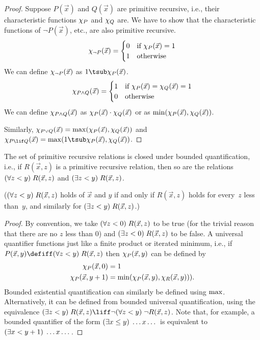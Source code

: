 \documentclass[../../../include/open-logic-section]{subfiles}
\begin{document}
\begin{proof}
  Suppose $P(\vec x)$ and $Q(\vec x)$ are primitive recursive, i.e.,
  their characteristic functions $\chi_{P}$ and $\chi_{Q}$ are.  We
  have to show that the characteristic functions of $\lnot P(\vec x)$,
  etc., are also primitive recursive.
  \[
  \Char{\lnot P}(\vec x) = \begin{cases}
    0 & \text{if $\Char{P}(\vec x) = 1$}\\
    1 & \text{otherwise}
  \end{cases}
  \]
  We can define $\chi_{\lnot P}(\vec x)$ as $1 \tsub \Char{P}(\vec x)$.
  \[
  \Char{P \land Q}(\vec x) = \begin{cases}
    1 & \text{if $\Char{P}(\vec x) = \Char{Q}(\vec x) = 1$}\\
    0 & \text{otherwise}
  \end{cases}
  \]
  We can define $\chi_{P \land Q}(\vec x)$ as $\chi_{P}(\vec x) \cdot
  \chi_{Q}(\vec x)$ or as $\mathrm{min}(\chi_{P}(\vec x), \chi_{Q}(\vec x))$.

  Similarly, $\chi_{P \lor Q}(\vec x) = \mathrm{max}(\chi_{P}(\vec x),
  \chi_{Q}(\vec x))$ and $\Char{P \lif Q}(\vec x) = \fn{max}(1 \tsub
  \Char{P}(\vec x), \Char{Q}(\vec x))$.
\end{proof}

\begin{prop}
  The set of primitive recursive relations is closed under bounded
  quantification, i.e., if $R(\vec x, z)$ is a primitive recursive
  relation, then so are the relations $(\forall z < y)\; R(\vec x, z)$
  and $(\exists z < y)\; R(\vec x, z)$.

  ($(\forall z < y)\; R(\vec x, z)$ holds of $\vec x$ and $y$ if and
  only if $R(\vec x, z)$ holds for every~$z$ less than~$y$, and
  similarly for $(\exists z < y)\; R(\vec x, z)$.)
\end{prop}

\begin{proof}
  By convention, we take $(\forall z < 0)\; R(\vec x, z)$ to be true
  (for the trivial reason that there are no $z$ less than $0$) and
  $(\exists z < 0)\; R(\vec x, z)$ to be false. A universal quantifier
  functions just like a finite product or iterated minimum, i.e., if
  $P(\vec x, y) \defiff \bforall{z < y}{R(\vec x, z)}$ then
  $\chi_{P}(\vec x, y)$ can be defined by
  \begin{align*}
    \Char{P}(\vec x, 0) & = 1\\
    \Char{P}(\vec x, y+1) & =
    \fn{min}(\Char{P}(\vec x, y), \Char{R}(\vec x, y))).
  \end{align*}
  Bounded existential quantification can similarly be defined using
  $\mathrm{max}$. Alternatively, it can be defined from bounded universal
  quantification, using the equivalence $\bexists{z < y}{R(\vec x, z)} \liff
  \lnot \bforall{z < y}{\lnot R(\vec x, z)}$. Note that, for example, a
  bounded quantifier of the form $(\exists x \leq y)\; \dots x\dots$ is
  equivalent to $(\exists x < y+1)\; \dots x \dots$.
\end{proof}
  
\end{document}
